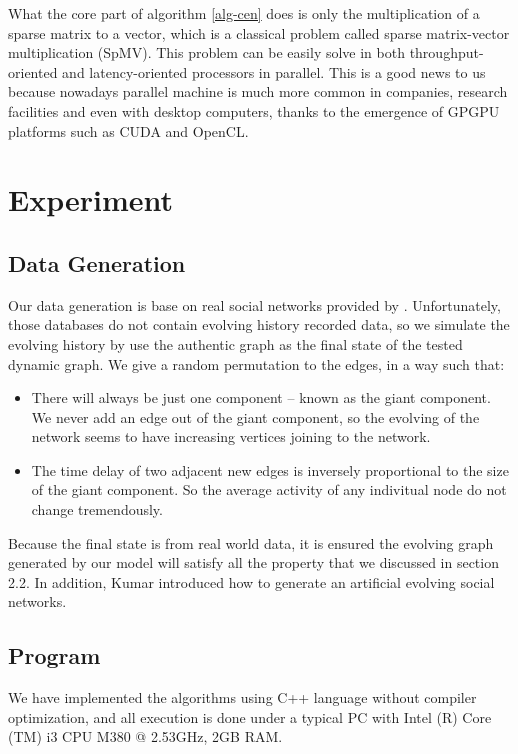 \documentclass[12pt,abstract=true]{scrartcl}
\numberwithin{equation}{section}
\theoremstyle{definition}   \newtheorem{definition}{Definition}[section]
\theoremstyle{plain}        \newtheorem{theorem}{Theorem}[section]
\theoremstyle{plain}        \newtheorem{observation}{Observation}[section]
\theoremstyle{plain}        \newtheorem{fact}{Fact}[section]
\theoremstyle{plain}        \newtheorem{claim}{Claim}[section]
\theoremstyle{plain}        \newtheorem{lemma}[theorem]{Lemma}
\theoremstyle{plain}        \newtheorem{corollary}[theorem]{Corollary}
\theoremstyle{remark}       \newtheorem{example}{Example}[section]
\theoremstyle{remark}       \newtheorem{remark}{Remark}[section]
\begin{document}
What the core part of algorithm \ref{alg-cen} does is only the multiplication
of a sparse matrix to a vector, which is a classical problem called sparse
matrix-vector multiplication (SpMV). This problem can be easily solve in both
throughput-oriented and latency-oriented processors in
parallel\cite{williams2009optimization, bell2008efficient,
bell2009implementing, catalyurek1999hypergraph, zhuo2005sparse}.  This is a
good news to us because nowadays parallel machine is much more common in
companies, research facilities and even with desktop computers, thanks to the
emergence of GPGPU platforms such as CUDA and OpenCL.

\section{Experiment}
\subsection{Data Generation} 
Our data generation is base on real social networks provided by \cite{database1,
database2}. Unfortunately, those databases do not contain evolving history
recorded data, so we simulate the evolving history by use the
authentic graph as the final state of the tested dynamic graph.
We give a random permutation to the edges, in a way such that:
\begin{itemize}
\item There will always
be just one component -- known as the giant component. We never add an edge out
of the giant component, so the evolving of the network seems to have increasing
vertices joining to the network.
\item The time delay of two adjacent new edges is inversely proportional to the
size of the giant component. So the average activity of any indivitual node do
not change tremendously.
\end{itemize}
Because the final state
is from real world data, it is ensured 
the evolving graph generated by our model will satisfy all the property that we
discussed in section 2.2. In addition, Kumar introduced how to generate
an artificial evolving social networks\cite{kumar2010structure}.

\subsection{Program}
We have implemented the algorithms using C++ language without compiler
optimization, and all execution is done under a typical PC with 
Intel (R) Core (TM) i3 CPU M380  @ 2.53GHz, 2GB RAM.
	
\end{document}
